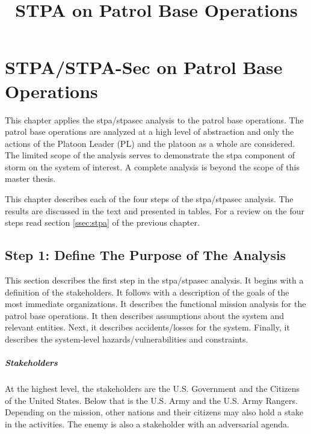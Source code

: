 \documentclass[../../main/main.tex]{subfiles}
\begin{document}
\title{STPA on Patrol Base Operations}

\chapter{STPA/STPA-Sec on Patrol Base Operations}\label{chp:stpapb}
This chapter applies the \gls{stpa}/\gls{stpasec} analysis to the patrol base operations.  The patrol base operations are analyzed at a high level of abstraction and only the actions of the Platoon Leader (PL) and the platoon as a whole are considered.  The limited scope of the analysis serves to demonstrate the \gls{stpa} component of \gls{storm} on the system of interest.  A complete analysis is beyond the scope of this master thesis. 

This chapter describes each of the four steps of the \gls{stpa}/\gls{stpasec} analysis.  The results are discussed in the text and presented in tables.   For a review on the four steps read section \ref{ssec:stpa} of the previous chapter.

\section{Step 1: Define The Purpose of The Analysis}\label{chp:stpapb:purpose}
This section describes the first step in the \gls{stpa}/\gls{stpasec} analysis.  It begins with a definition of the stakeholders.  It follows with a description of the goals of the most immediate organizations.  It describes the functional mission analysis for the patrol base operations.  It then describes assumptions about the system and relevant entities.  Next, it describes accidents/losses for the system.  Finally, it describes the system-level hazards/vulnerabilities and constraints.

\paragraph*{Stakeholders}
At the highest level, the stakeholders are the U.S. Government and the Citizens of the United States.  Below that is the U.S. Army and the U.S. Army Rangers.  Depending on the mission, other nations and their citizens may also hold a stake in the activities.  The enemy is also a stakeholder with an adversarial agenda. 
\end{document}
